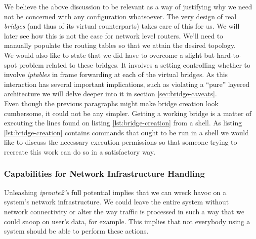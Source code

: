             We believe the above discussion to be relevant as a way of justifying why we need not be concerned with any configuration whatsoever. The very design of real \textit{bridges} (and thus of its virtual counterparts) takes care of this for us. We will later see how this is not the case for network level routers. We'll need to manually populate the routing tables so that we attain the desired topology.\\

            We would also like to state that we did have to overcome a slight but hard-to-spot problem related to these bridges. It involves a setting controlling whether to involve \textit{iptables} in frame forwarding at each of the virtual bridges. As this interaction has several important implications, such as violating a ``pure'' layered architecture we will delve deeper into it in section \ref{sec:bridge-caveats}.\\

            Even though the previous paragraphs might make bridge creation look cumbersome, it could not be any simpler. Getting a working bridge is a matter of executing the lines found on listing \ref{lst:bridge-creation} from a shell. As listing \ref{lst:bridge-creation} contains commands that ought to be run in a shell we would like to discuss the necessary execution permissions so that someone trying to recreate this work can do so in a satisfactory way.\\

            \subsubsection{Capabilities for Network Infrastructure Handling}
                Unleashing \textit{iproute2's} full potential implies that we can wreck havoc on a system's network infrastructure. We could leave the entire system without network connectivity or alter the way traffic is processed in such a way that we could snoop on user's data, for example. This implies that not everybody using a system should be able to perform these actions.\\

